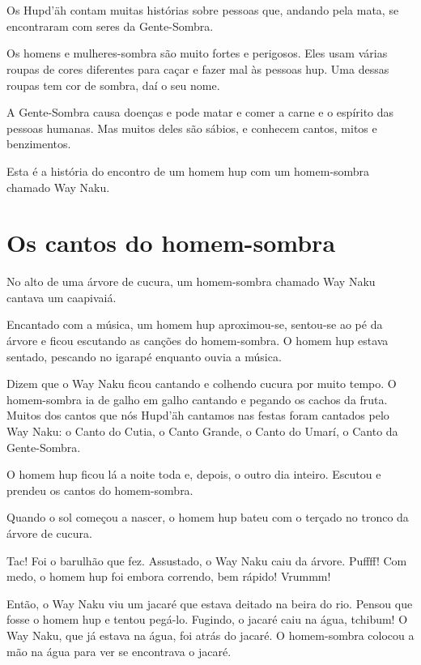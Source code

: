 \chapter*{}

Os Hupd'äh contam muitas histórias sobre pessoas que, andando pela mata, se
encontraram com seres da Gente-Sombra.

Os homens e mulheres-sombra são muito fortes e perigosos. Eles usam várias roupas de cores diferentes para caçar e fazer mal às pessoas hup. Uma dessas roupas tem cor de sombra,
daí o seu nome.

A Gente-Sombra causa doenças e pode matar e comer a carne e o espírito das pessoas humanas. Mas muitos deles são sábios, e conhecem cantos, mitos e benzimentos.

Esta é a história do encontro de um homem hup com um homem-sombra chamado Way Naku.

\chapter{Os cantos do homem-sombra}

No alto de uma árvore de
cucura, um homem-sombra
chamado Way Naku cantava
um caapivaiá.

Encantado com a música,
um homem hup aproximou-se, sentou-se ao pé da
árvore e ficou escutando as
canções do homem-sombra. O
homem hup estava sentado,
pescando no igarapé
enquanto ouvia a música.

Dizem que o Way Naku ficou
cantando e colhendo cucura
por muito tempo. O homem-sombra ia de galho em galho
cantando e pegando os cachos
da fruta. Muitos dos cantos
que nós Hupd’äh cantamos nas
festas foram cantados pelo Way
Naku: o Canto do Cutia, o Canto
Grande, o Canto do Umarí, o
Canto da Gente-Sombra.


O homem hup ficou
lá a noite toda e,
depois, o outro dia
inteiro. Escutou e
prendeu os cantos
do homem-sombra.


Quando o sol
começou a nascer,
o homem hup bateu
com o terçado no
tronco da árvore
de cucura.

Tac! Foi o barulhão
que fez. Assustado,
o Way Naku caiu da
árvore. Puffff!
Com medo, o homem
hup foi embora
correndo, bem
rápido! Vrummm!

Então, o Way Naku viu um
jacaré que estava deitado
na beira do rio. Pensou
que fosse o homem hup e
tentou pegá-lo. Fugindo,
o jacaré caiu na água,
tchibum! O Way Naku,
que já estava na água,
foi atrás do jacaré. O
homem-sombra colocou a
mão na água para ver se
encontrava o jacaré.

